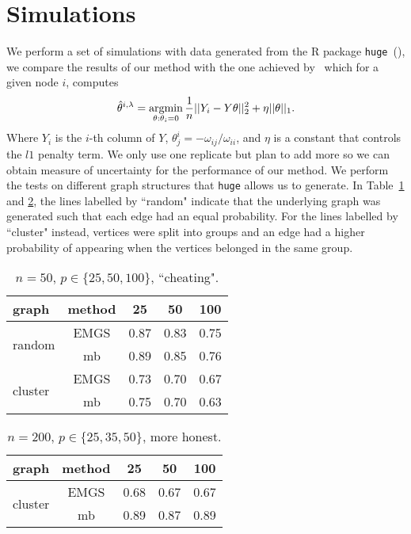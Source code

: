 \documentclass{scrartcl}
\DeclareMathOperator{\argmin}{argmin}
\newcommand{\1}{\mathds{1}}
\begin{document}
\section{Simulations}
We perform a set of simulations with data generated from the R package
\texttt{huge}~(\cite{huge2020}), we compare the results of our method with the
one achieved by~\cite{mein2006} which for a given node $i$, computes
\[\hat{\theta}^{i, \lambda} = \argmin\displaylimits_{\theta : \theta_i = 0}\frac{1}{n} ||Y_i - Y \theta||_2^2 + \eta ||\theta||_1.\]
Where $Y_i$ is the $i$-th column of $Y$, $\theta_j^i = -\omega_{ij}/\omega_{ii}$, and $\eta$ is a constant that controls the $l1$ penalty term.
We only use one replicate but plan to add more so we can obtain measure of uncertainty for the performance of our method.
We perform the tests on different graph structures that \texttt{huge} allows us to generate.
In Table~\ref{tab:cheat} and \ref{tab:honest}, the lines labelled by ``random" indicate that the
underlying graph was generated such that each edge had an equal probability. For the lines labelled by ``cluster" instead, vertices were split
into groups and an edge had a higher probability of appearing when the vertices
belonged in the same group.
\begin{table}
	\centering
	\small
	\caption{$n=50$, $p \in \{25, 50, 100\}$, ``cheating".}\label{tab:cheat}
	\begin{tabular}{|l||c|c|c|c|}
		\hline
		graph                    & method & 25   & 50   & 100  \\
		\hline
		\multirow{2}{*}{random}  & EMGS   & 0.87 & 0.83 & 0.75 \\
		                         & mb     & 0.89 & 0.85 & 0.76 \\
		\hline
		\multirow{2}{*}{cluster} & EMGS   & 0.73 & 0.70 & 0.67 \\
		                         & mb     & 0.75 & 0.70 & 0.63 \\
		\hline
	\end{tabular}
\end{table}
\begin{table}
	\centering
	\small
	\caption{$n=200$, $p \in \{25, 35, 50\}$, more honest.}\label{tab:honest}
	\begin{tabular}{|l||c|c|c|c|}
		\hline
		graph                    & method & 25   & 50   & 100  \\
		\hline
		\multirow{2}{*}{cluster} & EMGS   & 0.68 & 0.67 & 0.67 \\
		                         & mb     & 0.89 & 0.87 & 0.89 \\
		\hline
	\end{tabular}
\end{table}
\end{document}

